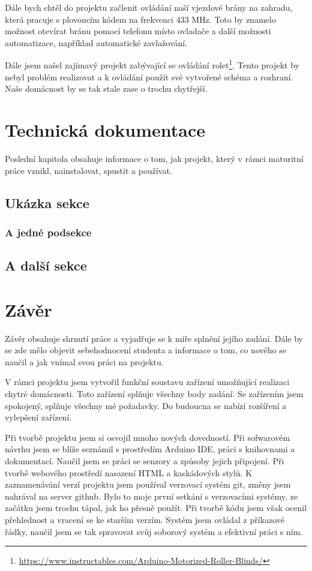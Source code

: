 \documentclass[11pt,a4paper,twoside,openright]{report}
\begin{document}
	
	Dále bych chtěl do projektu začlenit ovládání naší vjezdové brány na zahradu, která pracuje s plovoucím kódem na frekvenci 433 MHz. Toto by znamelo možnost otevírat bránu pomocí telefonu místo ovladače a další možnosti automatizace, například automatické zavlažování.
	
	
	Dále jsem našel zajímavý projekt zabývající se ovládání rolet\footnote{\url{https://www.instructables.com/Arduino-Motorized-Roller-Blinds/}}. Tento projekt by nebyl problém realizovat a k ovládání použít své vytvořené schéma a rozhraní. Naše domácnost by se tak stale zase o trochu chytřejší.
	
	\chapter{Technická dokumentace}
	
	Poslední kapitola obsahuje informace o tom, jak projekt, který v rámci maturitní práce vznikl, nainstalovat, spustit a používat.
	
	\section{Ukázka sekce}
	
	
	\subsection{A jedné podsekce}
	
	
	\section{A další sekce}
	
	
	\chapter*{Závěr}
	\pagestyle{empty}
	
	
	Závěr obsahuje shrnutí práce a vyjadřuje se k míře splnění jejího zadání. Dále by se zde mělo objevit sebehodnocení studenta a informace o tom, co nového se naučil a jak vnímal svou práci na projektu.
	
	V rámci projektu jsem vytvořil funkční soustavu zařízení umožňující realizaci chytré domácnosti. Toto zařízení splňuje všechny body zadání. Se zařízením jsem spokojený, splňuje všechny mé požadavky. Do budoucna se nabízí rozšíření a vylepšení zařízení.
	
	
	Při tvorbě projektu jsem si osvojil mnoho nových dovedností. Při sofwarovém návrhu jsem se blíže seznámil s prostředím Arduino IDE, práci s knihovnami a dokumentací. Naučil jsem se práci se senzory a způsoby jejich připojení. Při tvorbě webového prostředí nasazení HTML a kaskádových stylů. K zaznamenávání verzí projektu jsem používal verzovací systém git, změny jsem nahrával na server github. Bylo to moje první setkání s verzovacími systémy, ze začátku jsem trochu tápal, jak ho přesně použít. Při tvorbě kódu jsem však ocenil přehlednost a vracení se ke starším verzím. Systém jsem ovládal z příkazové řádky, naučil jsem se tak spravovat svůj soborový systém a efektivní práci s ním.
	
\end{document}
